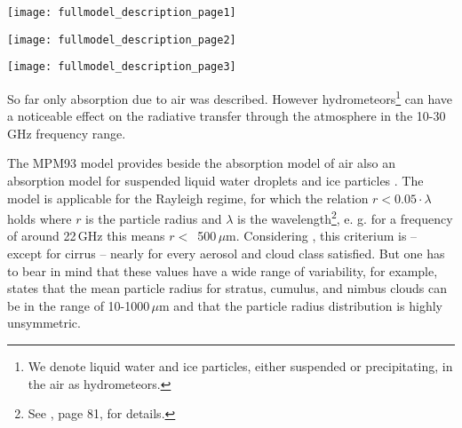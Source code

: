{\begin{flushleft}
 \texttt{[image: fullmodel\_description\_page1]}
\end{flushleft}
\begin{flushleft}
 \texttt{[image: fullmodel\_description\_page2]}
\end{flushleft}
\begin{flushleft}
 \texttt{[image: fullmodel\_description\_page3]}
\end{flushleft}








\label{labela:cloudabsorption}

\label{levelb:lipartabs}
So far only absorption due to air was described. However 
hydrometeors\footnote{We denote liquid water and ice particles, either
  suspended or precipitating, in the air as hydrometeors.}
can have a noticeable effect on the radiative transfer through the
atmosphere in the 10-30\,GHz frequency range.

The MPM93 model provides beside the absorption model of air also an
absorption model for suspended liquid water droplets and ice particles
\citep{liebe:89b,liebeetal:91,hufford:91,liebeetal:93}.  The model is
applicable for the Rayleigh regime, for which the relation $r <
0.05\cdot \lambda$ holds where $r$ is the particle radius and
$\lambda$ is the wavelength\footnote{See \citet{brussaard:95}, page
  81, for details.}, e. g. for a frequency of around 22\,GHz 
this means $r<$~500\,$\mu$m. Considering \citet{salby:96}, this criterium is --
except for cirrus -- nearly for every aerosol and cloud class
satisfied. But one has to bear in mind that these values have a wide
range of variability, for example, \citet{salby:96} states that the
mean particle radius for stratus, cumulus, and nimbus clouds can be in
the range of 10-1000\,$\mu$m and that the particle radius distribution
is highly unsymmetric. 

}
